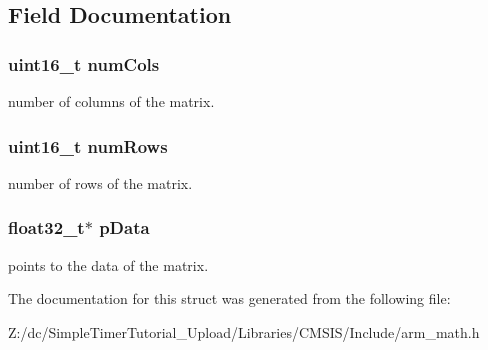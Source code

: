 \subsection{Field Documentation}
\hypertarget{structarm__matrix__instance__f32_a4bb5ec0d13eb4c9cf887aa8366a44117}{
\subsubsection[{num\-Cols}]{\setlength{\rightskip}{0pt plus 5cm}uint16\-\_\-t num\-Cols}}\label{structarm__matrix__instance__f32_a4bb5ec0d13eb4c9cf887aa8366a44117}
number of columns of the matrix. \hypertarget{structarm__matrix__instance__f32_a1bcf80ccdc2acc29198f1592ae300390}{
\subsubsection[{num\-Rows}]{\setlength{\rightskip}{0pt plus 5cm}uint16\-\_\-t num\-Rows}}\label{structarm__matrix__instance__f32_a1bcf80ccdc2acc29198f1592ae300390}
number of rows of the matrix. \hypertarget{structarm__matrix__instance__f32_af5c3a2f15c98850cdcfbe6f87e5ac5df}{
\subsubsection[{p\-Data}]{\setlength{\rightskip}{0pt plus 5cm}float32\-\_\-t$\ast$ p\-Data}}\label{structarm__matrix__instance__f32_af5c3a2f15c98850cdcfbe6f87e5ac5df}
points to the data of the matrix. 

The documentation for this struct was generated from the following file\-:\begin{DoxyCompactItemize}
\item 
Z\-:/dc/\-Simple\-Timer\-Tutorial\-\_\-\-Upload/\-Libraries/\-C\-M\-S\-I\-S/\-Include/arm\-\_\-math.\-h\end{DoxyCompactItemize}
